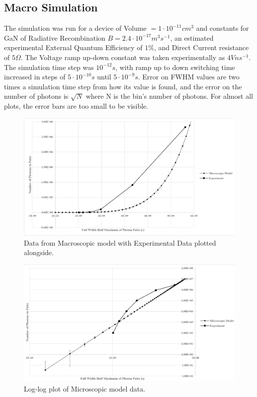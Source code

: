 \documentclass[titlepage]{article}
\begin{document}
\subsection{Macro Simulation}
The simulation was run for a device of Volume $= 1\cdot 10^{-11} cm^3 $ and constants for GaN of Radiative Recombination $B = 2.4\cdot10^{-17} m^3 s^{-1}$, an estimated experimental External Quantum Efficiency of $1\%$, and Direct Current resistance of $5\Omega$. The Voltage ramp up-down constant was taken experimentally as $4 V ns^{-1}$. The simulation time step was $10^{-12} s$, with ramp up to down switching time increased in steps of $5 \cdot 10^{-10} s$ until $5 \cdot 10^{-9} s$. Error on FWHM values are two times a simulation time step from how its value is found, and the error on the number of photons is $\sqrt{N}$ where N is the bin's number of photons. For almost all plots, the error bars are too small to be visible.\\
\begin{figure}[H]
	\centering
	\includegraphics[scale=0.6]{Figures/MacroGraph}
	\caption{Data from Macroscopic model with Experimental Data plotted alongside.\label{res:Mac:G1}}
\end{figure}
\begin{figure}[H]
	\centering
	\includegraphics[scale=0.6]{Figures/MacroGraph_log}
	\caption{Log-log plot of Microscopic model data.\label{res:Mac:G1_log}}
\end{figure}
\bigskip
\end{document}

